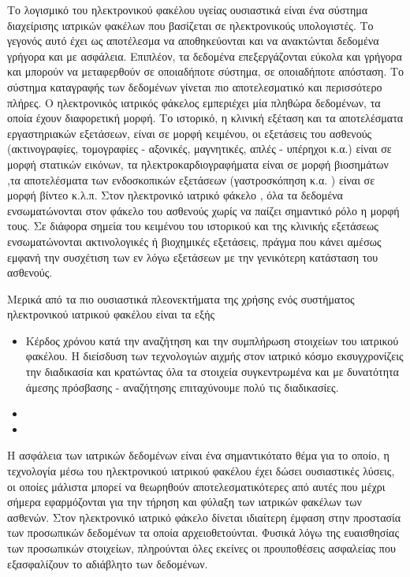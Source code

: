 Το λογισμικό του ηλεκτρονικού φακέλου υγείας ουσιαστικά είναι ένα σύστημα διαχείρισης ιατρικών φακέλων που βασίζεται σε ηλεκτρονικούς υπολογιστές. Το γεγονός αυτό έχει ως αποτέλεσμα να αποθηκεύονται και να ανακτώνται δεδομένα γρήγορα και με ασφάλεια. Επιπλέον, τα δεδομένα επεξεργάζονται εύκολα και γρήγορα και μπορούν να μεταφερθούν σε οποιαδήποτε σύστημα, σε οποιαδήποτε απόσταση. Το σύστημα καταγραφής των δεδομένων γίνεται πιο αποτελεσματικό και περισσότερο πλήρες. Ο ηλεκτρονικός ιατρικός φάκελος εμπεριέχει μία πληθώρα δεδομένων, τα οποία έχουν διαφορετική μορφή. Το ιστορικό, η κλινική εξέταση και τα αποτελέσματα εργαστηριακών εξετάσεων, είναι σε μορφή κειμένου, οι εξετάσεις του ασθενούς (ακτινογραφίες, τομογραφίες - αξονικές, μαγνητικές, απλές - υπέρηχοι κ.α.) είναι σε μορφή στατικών εικόνων, τα ηλεκτροκαρδιογραφήματα είναι σε μορφή βιοσημάτων ,τα αποτελέσματα των ενδοσκοπικών εξετάσεων (γαστροσκόπηση κ.α. ) είναι σε μορφή βίντεο κ.λ.π.  Στον ηλεκτρονικό ιατρικό φάκελο , όλα τα δεδομένα ενσωματώνονται στον φάκελο του ασθενούς χωρίς να παίζει σημαντικό ρόλο η μορφή τους. Σε διάφορα σημεία του κειμένου του ιστορικού και της κλινικής εξετάσεως ενσωματώνονται ακτινολογικές ή βιοχημικές εξετάσεις, πράγμα που κάνει αμέσως εμφανή την συσχέτιση των εν λόγω εξετάσεων με την γενικότερη κατάσταση του ασθενούς.

Μερικά από τα πιο ουσιαστικά πλεονεκτήματα της χρήσης ενός συστήματος ηλεκτρονικού ιατρικού φακέλου είναι τα εξής
\begin{itemize}

\item Κέρδος χρόνου κατά την αναζήτηση και την συμπλήρωση στοιχείων του ιατρικού φακέλου. Η διείσδυση των τεχνολογιών αιχμής στον ιατρικό κόσμο εκσυγχρονίζεις την διαδικασία και κρατώντας όλα τα στοιχεία συγκεντρωμένα και με δυνατότητα άμεσης πρόσβασης - αναζήτησης επιταχύνουμε πολύ τις διαδικασίες.


\item

\item


\end{itemize}



Η ασφάλεια των ιατρικών δεδομένων είναι ένα σημαντικότατο θέμα για το οποίο, η
τεχνολογία μέσω του ηλεκτρονικού ιατρικού φακέλου έχει δώσει ουσιαστικές λύσεις, οι οποίες
μάλιστα μπορεί να θεωρηθούν αποτελεσματικότερες από αυτές που μέχρι σήμερα εφαρμόζονται
για την τήρηση και φύλαξη των ιατρικών φακέλων των ασθενών.
Στον ηλεκτρονικό ιατρικό φάκελο δίνεται ιδιαίτερη έμφαση στην προστασία των
προσωπικών δεδομένων τα οποία αρχειοθετούνται. Φυσικά λόγω της ευαισθησίας των
προσωπικών στοιχείων, πληρούνται όλες εκείνες οι προυποθέσεις ασφαλείας που εξασφαλίζουν
το αδιάβλητο των δεδομένων. 


